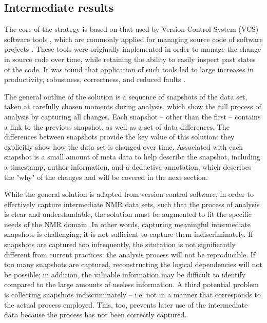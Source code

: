 \subsection{Intermediate results}
The core of the strategy is based on that used by Version Control System (VCS) 
software tools \cite{vcs_concepts, hinsen2009vcs}, which are commonly 
applied for managing source code of 
software projects \cite{loeliger2012git, cvs, svn}.  
These tools were originally implemented in order to manage the change in 
source code over time, while retaining the ability to easily inspect past 
states of the code.  It was found that application of such tools led to 
large increases in productivity, robustness, correctness, and reduced 
faults \cite{fischer2003vcs}.

The general outline of the solution 
is a sequence of snapshots of the data set, taken at carefully chosen 
moments during analysis, which show the full process of analysis by capturing
all changes.  Each snapshot -- other than the first -- contains a link to
the previous snapshot, as well as a set of data differences.  The differences
between snapshots provide the key value of this solution: they explicitly
show how the data set is changed over time.
Associated with each snapshot is a small amount of meta data to help describe
the snapshot, including a timestamp, author information, and a deductive
annotation, which describes the "why" of the changes and will be covered in
the next section.

While the general solution is adapted from version control software, in order
to effectively capture intermediate NMR data sets, such that the process of
analysis is clear and understandable, the solution must be augmented to fit
the specific needs of the NMR domain.
In other words, capturing meaningful intermediate snapshots is challenging; it 
is not sufficient to capture them indiscriminately.  If snapshots are captured 
too infrequently, the situtation is not significantly different from current 
practices: the analysis process will not be reproducible.  If too many snapshots
are captured, reconstructing the logical dependencies will not be possible;
in addition, the valuable information may be difficult to identify compared to
the large amounts of useless information.  A third potential problem is 
collecting snapshots indiscriminately -- i.e. not in a manner that corresponds
to the actual process employed.  This, too, prevents later use of the 
intermediate data because the process has not been correctly captured.

